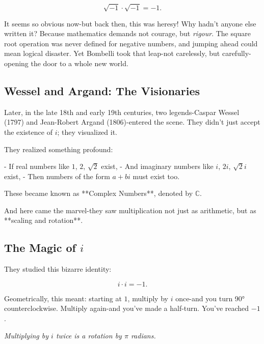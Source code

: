 \[
\sqrt{-1} \cdot \sqrt{-1} = -1.
\]

It seems so obvious now-but back then, this was heresy! Why hadn’t anyone else written it? Because mathematics demands not courage, but \emph{rigour}. The square root operation was never defined for negative numbers, and jumping ahead could mean logical disaster. Yet Bombelli took that leap-not carelessly, but carefully-opening the door to a whole new world.

\subsection*{Wessel and Argand: The Visionaries}

Later, in the late 18th and early 19th centuries, two legends-Caspar Wessel (1797) and Jean-Robert Argand (1806)-entered the scene. They didn’t just accept the existence of $i$; they visualized it.

They realized something profound:

- If real numbers like $1$, $2$, $\sqrt{2}$ exist,
- And imaginary numbers like $i$, $2i$, $\sqrt{2}i$ exist,
- Then numbers of the form $a + bi$ must exist too.

These became known as **Complex Numbers**, denoted by $\mathbb{C}$.

And here came the marvel-they saw multiplication not just as arithmetic, but as **scaling and rotation**.

\subsection*{The Magic of $i$}

They studied this bizarre identity:

\[
i \cdot i = -1.
\]

Geometrically, this meant: starting at $1$, multiply by $i$ once-and you turn 90° counterclockwise. Multiply again-and you've made a half-turn. You’ve reached $-1$.

\begin{center}

\textit{Multiplying by $i$ twice is a rotation by $\pi$ radians.}
\end{center}

